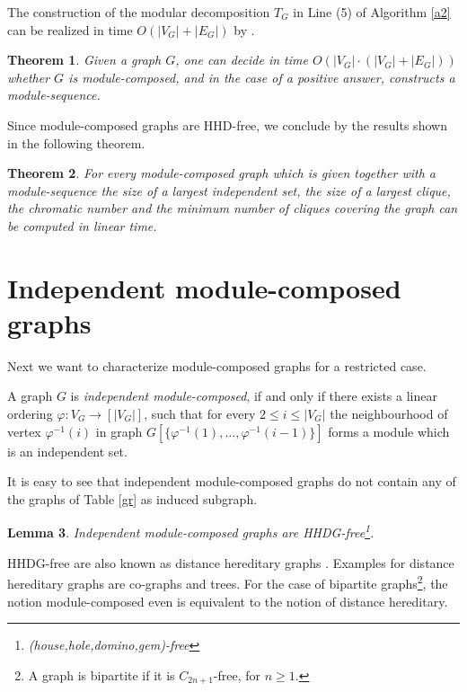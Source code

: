 \documentclass[11pt]{article}
\newtheorem{theorem}{Theorem}[section]
\newtheorem{lemma}[theorem]{Lemma}
\begin{document}
The construction of the modular decomposition $T_G$ in Line (5) of Algorithm \ref{a2} 
can be realized in time $O(|V_G|+|E_G|)$ by \cite{CH94,MS99}. 


\begin{theorem}
Given a graph $G$, one can decide in time $O(|V_G|\cdot(|V_G| + |E_G|))$ whether
$G$ is module-composed, and in the case of a positive answer, constructs  a module-sequence.
\end{theorem}






Since module-composed graphs are HHD-free, we conclude by the results shown in
\cite{JO88} the following theorem.

\begin{theorem}
For every module-composed graph which is given together with a module-sequence the size of a largest independent set, the size of a largest clique, 
the chromatic number and the minimum number of cliques covering the graph
can be computed in linear time.
\end{theorem}






\section{Independent module-composed graphs}



Next we want to characterize module-composed graphs for a restricted case.

A graph $G$ is {\em independent module-composed}, if and only if there exists a linear 
ordering $\varphi:V_G \to [|V_G|]$, such that for every $2\leq i\leq|V_G|$ 
the neighbourhood of vertex $\varphi^{-1}(i)$ in graph $G[\{\varphi^{-1}(1),\ldots,\varphi^{-1}(i-1)\}]$ 
forms a module which is an independent set.



It is easy to see that independent module-composed graphs do not contain
any of the graphs of Table \ref{gr} as induced subgraph.


\begin{lemma}
Independent module-composed graphs are HHDG-free\footnote{(house,hole,domino,gem)-free}.
\end{lemma}

HHDG-free are also known as distance hereditary graphs \cite{HM90,BM86}.
Examples for distance hereditary graphs are co-graphs and trees.
For the case of bipartite graphs\footnote{A graph is bipartite if it is $C_{2n+1}$-free, for $n\ge 1$.}, the notion module-composed 
even is equivalent to the notion of distance hereditary. 
\end{document}
